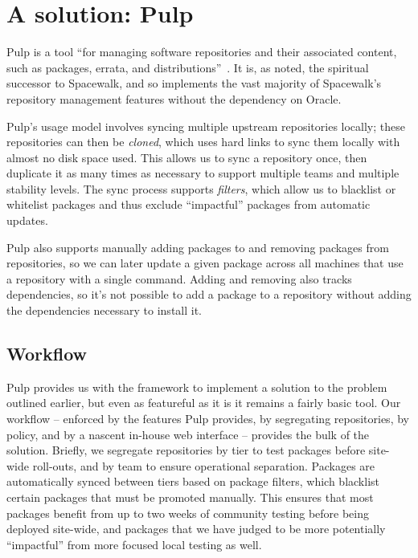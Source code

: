 \section{A solution: Pulp}
\label{sec:pulp}

Pulp is a tool ``for managing software repositories and their
associated content, such as packages, errata, and
distributions''~\cite{Dob11}.  It is, as noted, the spiritual
successor to Spacewalk, and so implements the vast majority of
Spacewalk's repository management features without the dependency on
Oracle.

Pulp's usage model involves syncing multiple upstream repositories
locally; these repositories can then be \emph{cloned}, which uses hard
links to sync them locally with almost no disk space used.  This
allows us to sync a repository once, then duplicate it as many times
as necessary to support multiple teams and multiple stability levels.
The sync process supports \emph{filters}, which allow us to blacklist
or whitelist packages and thus exclude ``impactful'' packages from
automatic updates.

Pulp also supports manually adding packages to and removing packages
from repositories, so we can later update a given package across all
machines that use a repository with a single command.  Adding and
removing also tracks dependencies, so it's not possible to add a
package to a repository without adding the dependencies necessary to
install it.

\subsection{Workflow}

Pulp provides us with the framework to implement a solution to the
problem outlined earlier, but even as featureful as it is it remains a
fairly basic tool.  Our workflow -- enforced by the features Pulp
provides, by segregating repositories, by policy, and by a nascent
in-house web interface -- provides the bulk of the solution.  Briefly,
we segregate repositories by tier to test packages before site-wide
roll-outs, and by team to ensure operational separation.  Packages are
automatically synced between tiers based on package filters, which
blacklist certain packages that must be promoted manually.  This
ensures that most packages benefit from up to two weeks of community
testing before being deployed site-wide, and packages that we have
judged to be more potentially ``impactful'' from more focused local
testing as well.

